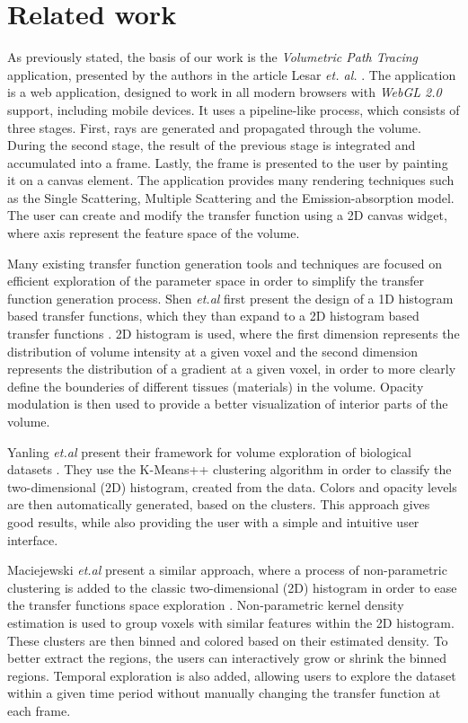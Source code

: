 \documentclass{egpubl-eurovis-short}
\begin{document}
\section{Related work}
As previously stated, the basis of our work is the \textit{Volumetric Path Tracing} application, presented by the authors in the article Lesar \textit{et. al.} \cite{lesar2018real}. The application is a web application, designed to work in all modern browsers with \textit{WebGL 2.0} support, including mobile devices. It uses a pipeline-like process, which consists of three stages. First, rays are generated and propagated through the volume. During the second stage, the result of the previous stage is integrated and accumulated into a frame. Lastly, the frame is presented to the user by painting it on a canvas element. The application provides many rendering techniques such as the Single Scattering, Multiple Scattering and the Emission-absorption model. The user can create and modify the transfer function using a 2D canvas widget, where axis represent the feature space of the volume.

Many existing transfer function generation tools and techniques are focused on efficient exploration of the parameter space in order to simplify the transfer function generation process. Shen \textit{et.al} first present the design of a 1D histogram based transfer functions, which they than expand to a 2D histogram based transfer functions \cite{shen2012visualization}. 2D histogram is used, where the first dimension represents the distribution of volume intensity at a given voxel and the second dimension represents the distribution of a gradient at a given voxel, in order to more clearly define the bounderies of different tissues (materials) in the volume. Opacity modulation is then used to provide a better visualization of interior parts of the volume.

Yanling \textit{et.al} present their framework for volume exploration of biological datasets \cite{liu2011quick2insight}. They use the K-Means++ clustering algorithm in order to classify the two-dimensional (2D) histogram, created from the data. Colors and opacity levels are then automatically generated, based on the clusters. This approach gives good results, while also providing the user with a simple and intuitive user interface. 

Maciejewski \textit{et.al} present a similar approach, where a process of non-parametric clustering is added to the classic two-dimensional (2D) histogram in order to ease the transfer functions space exploration \cite{maciejewski2009structuring}. Non-parametric kernel density estimation is used to group voxels with similar features within the 2D histogram. These clusters are then binned and colored based on their estimated density. To better extract the regions, the users can interactively grow or shrink the binned regions. Temporal exploration is also added, allowing users to explore the dataset within a given time period without manually changing the transfer function at each frame.
\end{document}
